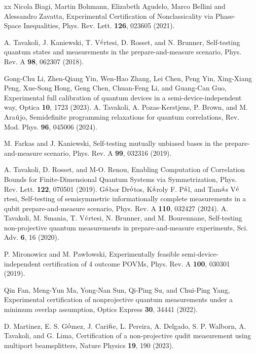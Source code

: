 \documentclass[letterpaper,preprint,superscriptaddress,floatfix,showpacs]{revtex4}
\begin{document}
\begin{thebibliography}{xx}
 Nicola Biagi, Martin Bohmann, Elizabeth Agudelo, Marco Bellini and Alessandro Zavatta, Experimental Certification of Nonclassicality via Phase-Space Inequalities, Phys. Rev. Lett. {\bf 126}, 023605 (2021).


 A. Tavakoli, J. Kaniewski, T. V$\rm \acute{e}$rtesi, D. Rosset, and N. Brunner, Self-testing quantum states and measurements in the prepare-and-measure scenario, Phys. Rev. A {\bf 98}, 062307 (2018).

 Gong-Chu Li, Zhen-Qiang Yin, Wen-Hao Zhang, Lei Chen, Peng Yin, Xing-Xiang Peng, Xue-Song Hong, Geng Chen, Chuan-Feng Li, and Guang-Can Guo, Experimental full calibration of quantum devices in a semi-device-independent way, Optica {\bf 10}, 1723 (2023).
 A. Tavakoli, A. Pozas-Kerstjens, P. Brown, and M. Ara$\rm \acute{u}$jo, Semidefinite programming relaxations for quantum correlations, Rev. Mod. Phys. {\bf 96}, 045006 (2024).

 M. Farkas and J. Kaniewski, Self-testing mutually unbiased bases in the prepare-and-measure scenario, Phys. Rev. A {\bf 99}, 032316 (2019).

 A. Tavakoli, D. Rosset, and M-O. Renou, Enabling Computation of Correlation Bounds for Finite-Dimensional Quantum Systems via Symmetrization, Phys. Rev. Lett. {\bf 122}, 070501 (2019).
 G$\rm \acute{a}$bor Dr$\rm \acute{o}$tos, K$\rm \acute{a}$roly F. P$\rm \acute{a}$l, and Tam$\rm \acute{a}$s V$\rm \acute{e}$rtesi, Self-testing of semisymmetric informationally complete measurements in a qubit prepare-and-measure scenario, Phys. Rev. A {\bf 110}, 032427 (2024).
 A. Tavakoli, M. Smania, T. V$\rm \acute{e}$rtesi, N. Brunner, and M. Bourennane, Self-testing non-projective quantum measurements in prepare-and-measure experiments, Sci. Adv. {\bf 6}, 16 (2020).

 P. Mironowicz and M. Paw{\l}owski, Experimentally feasible semi-device-independent certification of 4 outcome POVMs, Phys. Rev. A {\bf 100}, 030301 (2019).


 Qin Fan, Meng-Yun Ma, Yong-Nan Sun, Qi-Ping Su, and Chui-Ping Yang, Experimental certification of nonprojective quantum measurements under a minimum overlap assumption, Optics Express {\bf 30}, 34441 (2022).

 D. Martinez, E. S. G$\rm \acute{o}$mez, J. Cari$\rm \tilde{n}$e, L. Pereira, A. Delgado, S. P. Walborn, A. Tavakoli, and G. Lima, Certification of a non-projective qudit measurement using multiport beamsplitters, Nature Physics {\bf 19}, 190 (2023).



\end{thebibliography}
\end{document}
